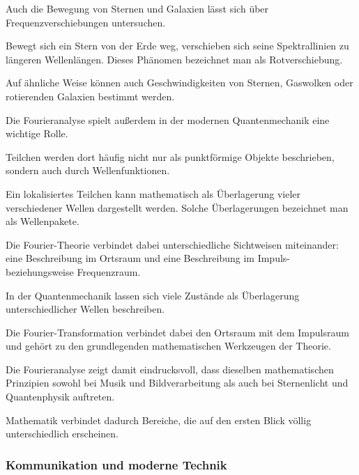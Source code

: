Auch die Bewegung von Sternen und Galaxien lässt sich über Frequenzverschiebungen untersuchen.

Bewegt sich ein Stern von der Erde weg,
verschieben sich seine Spektrallinien zu längeren Wellenlängen.
Dieses Phänomen bezeichnet man als Rotverschiebung.

Auf ähnliche Weise können auch Geschwindigkeiten von Sternen,
Gaswolken
oder rotierenden Galaxien bestimmt werden.

\medskip

Die Fourieranalyse spielt außerdem in der modernen Quantenmechanik eine wichtige Rolle.

Teilchen werden dort häufig nicht nur als punktförmige Objekte beschrieben,
sondern auch durch Wellenfunktionen.

Ein lokalisiertes Teilchen kann mathematisch als Überlagerung vieler verschiedener Wellen dargestellt werden.
Solche Überlagerungen bezeichnet man als Wellenpakete.

Die Fourier-Theorie verbindet dabei unterschiedliche Sichtweisen miteinander:
eine Beschreibung im Ortsraum
und eine Beschreibung im Impuls- beziehungsweise Frequenzraum.

\begin{DidacticBox}
	\small
	\label{box:fourier-quantenmechanik}
	In der Quantenmechanik lassen sich viele Zustände
	als Überlagerung unterschiedlicher Wellen beschreiben.
	
	Die Fourier-Transformation verbindet dabei
	den Ortsraum mit dem Impulsraum
	und gehört zu den grundlegenden mathematischen Werkzeugen der Theorie.
\end{DidacticBox}

Die Fourieranalyse zeigt damit eindrucksvoll,
dass dieselben mathematischen Prinzipien
sowohl bei Musik und Bildverarbeitung
als auch bei Sternenlicht und Quantenphysik auftreten.

Mathematik verbindet dadurch Bereiche,
die auf den ersten Blick völlig unterschiedlich erscheinen.

\subsubsection*{Kommunikation und moderne Technik}

